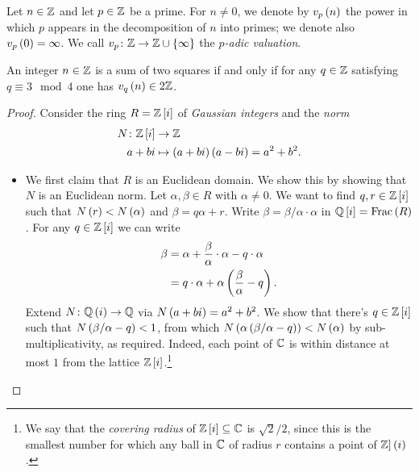 \documentclass[11pt]{article}
\begin{document}
\begin{definition}
Let $n \in \mathbb{Z}$ and let $p \in \mathbb{Z}$ be a prime. For $n \neq 0$, we denote by $v_p\left( n \right)$ the power in which $p$ appears in the decomposition of $n$ into primes; we denote also $v_p\left( 0 \right) = \infty$.
We call $v_p \colon \mbb{Z} \to \mbb{Z} \cup \set{\infty}$ the \emph{$p$-adic valuation}.
\end{definition}

\begin{theorem}[Fermat]
An integer $n \in \mathbb{Z}$ is a sum of two squares if and only if for any $q \in \mathbb{Z}$ satisfying $q \equiv 3 \mod{4}$ one has $v_q\left( n \right) \in 2 \mathbb{Z}$.
\end{theorem}

\begin{proof}
Consider the ring $R = \mathbb{Z}\left[ i \right]$ of \emph{Gaussian integers} and the \emph{norm}
\begin{align*}
N \colon \mathbb{Z}\left[ i \right] &\to \mathbb{Z} \\
a + bi &\mapsto \left( a+bi \right)\left( a-bi \right) = a^2 + b^2 \text{.}
\end{align*}

\begin{itemize}
\item

We first claim that $R$ is an Euclidean domain. We show this by showing that $N$ is an Euclidean norm.
Let $\alpha,\beta \in R$ with $\alpha \neq 0$. We want to find $q,r \in \mathbb{Z}\left[ i \right]$ such that $N\left( r \right) < N\left( \alpha \right)$ and $\beta = q \alpha + r$.
Write $\beta = \beta / \alpha \cdot \alpha$ in $\mathbb{Q}\left[ i \right] = \mathrm{Frac}\left( R \right)$. For any $q \in \mathbb{Z}\left[ i \right]$ we can write
\begin{align*}
\beta &= \alpha + \frac{\beta}{\alpha} \cdot \alpha - q \cdot \alpha \\&= q \cdot \alpha + \alpha\left( \frac{\beta}{\alpha} - q \right) \text{.}
\end{align*}
Extend $N \colon \mathbb{Q}\left( i \right) \to \mathbb{Q}$ via $N\left( a + bi \right) = a^2 + b^2$.
We show that there's $q \in \mathbb{Z}\left[ i \right]$ such that $N\left( \beta / \alpha - q \right) < 1$, from which $N\left( \alpha\left( \beta / \alpha - q \right) \right) < N\left( \alpha \right)$ by sub-multiplicativity, as required.
Indeed, each point of $\mathbb{C}$ is within distance at most $1$ from the lattice $\mathbb{Z}\left[ i \right]$.\footnote{We say that the \emph{covering radius} of $\mathbb{Z}\left[ i \right] \subseteq \mathbb{C}$ is $\sqrt{2}/2$, since this is the smallest number for which any ball in $\mathbb{C}$ of radius $r$ contains a point of $\mathbb{Z}]\left( i \right)$.}


\end{itemize}
\end{proof}
\end{document}
